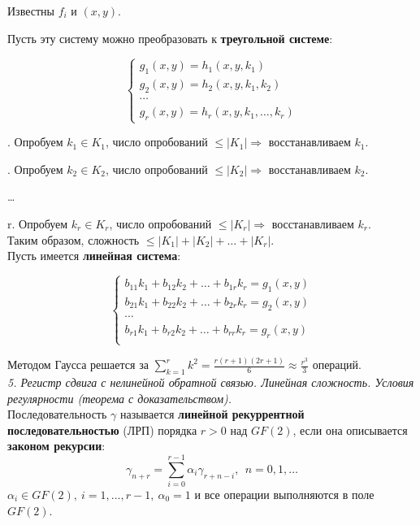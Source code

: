 \noindent Известны $f_i$ и $(x, y)$.

Пусть эту систему можно преобразовать к \textbf{треугольной системе}:

\begin{equation*}
    \begin{cases}
    g_1 (x, y) = h_1 (x, y, k_1) \\
    g_2 (x, y) = h_2 (x, y, k_1, k_2) \\
    \cdots \\
    g_r (x, y) = h_r (x, y, k_1, \ldots, k_r) 
    \end{cases}
\end{equation*}

. Опробуем $k_1 \in K_1$, число опробований $\le |K_1| \Rightarrow$ восстанавливаем $k_1$.

. Опробуем $k_2 \in K_2$, число опробований $\le |K_2| \Rightarrow$ восстанавливаем $k_2$.

\noindent \ldots

\noindent r. Опробуем $k_r \in K_r$, число опробований $\le |K_r| \Rightarrow$ восстанавливаем $k_r$. \\

\noindent Таким образом, сложность $\le |K_1| + |K_2| + \ldots + |K_r|$. \\

Пусть имеется \textbf{линейная система}:

\begin{equation*}
    \begin{cases}
    b_{11} k_1 + b_{12} k_2 + \ldots + b_{1r} k_r = g_1 (x, y)  \\
    b_{21} k_1 + b_{22} k_2 + \ldots + b_{2r} k_r = g_2 (x, y)  \\
    \cdots \\
    b_{r1} k_1 + b_{r2} k_2 + \ldots + b_{rr} k_r = g_r (x, y)  \\
    \end{cases}
\end{equation*}

\noindent Методом Гаусса решается за $\sum_{k=1}^r k^2 = \frac{r(r + 1)(2 r + 1)}{6} \approx \frac{r^3}{3}$ операций. \\

\noindent \textit{5. Регистр сдвига с нелинейной обратной связью. Линейная сложность. Условия регулярности (теорема с доказательством).} \\

Последовательность $\gamma$ называется \textbf{линейной рекуррентной последовательностью} (ЛРП) порядка $r > 0$ над $GF(2)$, если она описывается \textbf{законом рекурсии}:
$$\gamma_{n+r} = \sum_{i=0}^{r-1} \alpha_i \gamma_{r+n-i},\ \ n = 0,1,\ldots$$
\noindent $\alpha_i \in GF(2),\ i=1,\ldots,r-1,\ \alpha_0 = 1$ и все операции выполняются в поле $GF(2)$.

